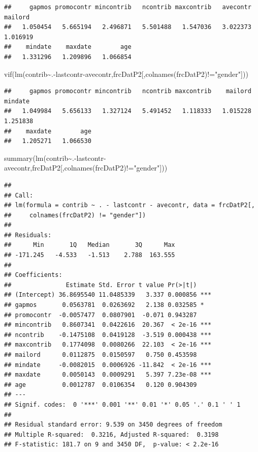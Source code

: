 \documentclass[
]{article}
\newenvironment{Shaded}{\begin{snugshade}}{\end{snugshade}}
\newcommand{\FunctionTok}[1]{\textcolor[rgb]{0.00,0.00,0.00}{#1}}
\newcommand{\NormalTok}[1]{#1}
\newcommand{\SpecialCharTok}[1]{\textcolor[rgb]{0.00,0.00,0.00}{#1}}
\newcommand{\StringTok}[1]{\textcolor[rgb]{0.31,0.60,0.02}{#1}}
\begin{document}
\begin{verbatim}
##     gapmos promocontr mincontrib   ncontrib maxcontrib   avecontr    mailord 
##   1.050454   5.665194   2.496871   5.501488   1.547036   3.022373   1.016919 
##    mindate    maxdate        age 
##   1.331296   1.209896   1.066854
\end{verbatim}

\begin{Shaded}
\begin{Highlighting}[]
\FunctionTok{vif}\NormalTok{(}\FunctionTok{lm}\NormalTok{(contrib}\SpecialCharTok{\textasciitilde{}}\NormalTok{.}\SpecialCharTok{{-}}\NormalTok{lastcontr}\SpecialCharTok{{-}}\NormalTok{avecontr,frcDatP2[,}\FunctionTok{colnames}\NormalTok{(frcDatP2)}\SpecialCharTok{!=}\StringTok{"gender"}\NormalTok{]))}
\end{Highlighting}
\end{Shaded}

\begin{verbatim}
##     gapmos promocontr mincontrib   ncontrib maxcontrib    mailord    mindate 
##   1.049984   5.656133   1.327124   5.491452   1.118333   1.015228   1.251838 
##    maxdate        age 
##   1.205271   1.066530
\end{verbatim}

\begin{Shaded}
\begin{Highlighting}[]
\FunctionTok{summary}\NormalTok{(}\FunctionTok{lm}\NormalTok{(contrib}\SpecialCharTok{\textasciitilde{}}\NormalTok{.}\SpecialCharTok{{-}}\NormalTok{lastcontr}\SpecialCharTok{{-}}\NormalTok{avecontr,frcDatP2[,}\FunctionTok{colnames}\NormalTok{(frcDatP2)}\SpecialCharTok{!=}\StringTok{"gender"}\NormalTok{]))}
\end{Highlighting}
\end{Shaded}

\begin{verbatim}
## 
## Call:
## lm(formula = contrib ~ . - lastcontr - avecontr, data = frcDatP2[, 
##     colnames(frcDatP2) != "gender"])
## 
## Residuals:
##      Min       1Q   Median       3Q      Max 
## -171.245   -4.533   -1.513    2.788  163.555 
## 
## Coefficients:
##               Estimate Std. Error t value Pr(>|t|)    
## (Intercept) 36.8695540 11.0485339   3.337 0.000856 ***
## gapmos       0.0563781  0.0263692   2.138 0.032585 *  
## promocontr  -0.0057477  0.0807901  -0.071 0.943287    
## mincontrib   0.8607341  0.0422616  20.367  < 2e-16 ***
## ncontrib    -0.1475108  0.0419128  -3.519 0.000438 ***
## maxcontrib   0.1774098  0.0080266  22.103  < 2e-16 ***
## mailord      0.0112875  0.0150597   0.750 0.453598    
## mindate     -0.0082015  0.0006926 -11.842  < 2e-16 ***
## maxdate      0.0050143  0.0009291   5.397 7.23e-08 ***
## age          0.0012787  0.0106354   0.120 0.904309    
## ---
## Signif. codes:  0 '***' 0.001 '**' 0.01 '*' 0.05 '.' 0.1 ' ' 1
## 
## Residual standard error: 9.539 on 3450 degrees of freedom
## Multiple R-squared:  0.3216, Adjusted R-squared:  0.3198 
## F-statistic: 181.7 on 9 and 3450 DF,  p-value: < 2.2e-16
\end{verbatim}
\end{document}
